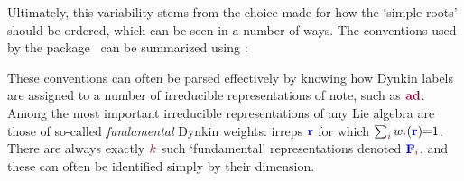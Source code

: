 \documentclass[12pt,a4paper]{article}\let\ifpdf\relax
\begin{document}
Ultimately, this variability stems from the choice made for how the `simple roots' should be ordered, which can be seen in a number of ways. The conventions used by the package \rpackage~can be summarized using :\\[-18pt]
%
%

These conventions can often be parsed effectively by knowing how Dynkin labels are assigned to a number of irreducible representations of note, such as $\mathbf{\r{ad}}$. Among the most important irreducible representations of any Lie algebra are those of so-called \emph{fundamental} Dynkin weights: irreps $\mathbf{\b{r}}$ for which $\sum_{\r{i}}w_\r{i}(\mathbf{\b{r}}){=}1$. There are always exactly $\r{k}$ such `fundamental' representations denoted $\mathbf{\b{F}}_{\r{i}}$, and these can often be identified simply by their dimension.
\end{document}
